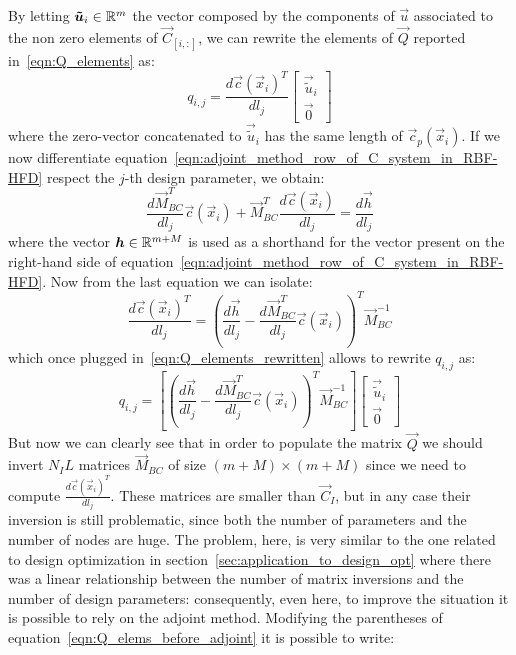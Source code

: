 By letting $\boldsymbol{\tilde{u}}_i \in \mathbb{R}^m$ the vector composed by the components of $\vec{u}$ associated to the non zero elements of $\vec{C}_{[i,:]}$, we can rewrite the elements of $\vec{Q}$ reported in~\eqref{eqn:Q_elements} as:
\begin{equation}
	\label{eqn:Q_elements_rewritten}
	q_{i,j} =
	\frac{d\vec{c}(\vec{x}_i)^T}{dl_j}
	\begin{bmatrix}
		\vec{\tilde{u}}_i  \\
		\vec{0}
	\end{bmatrix}
\end{equation}
where the zero-vector concatenated to $\vec{\tilde{u}}_i$ has the same length of $\vec{c}_p(\vec{x}_i)$.
If we now differentiate equation~\eqref{eqn:adjoint_method_row_of_C_system_in_RBF-HFD} respect the $j$-th design parameter, we obtain:
\begin{equation}
	\frac{d \vec{M}_{BC}^T}{d l_j} \vec{c}(\vec{x}_i) + \vec{M}_{BC}^T \frac{d \vec{c}(\vec{x}_i)}{d l_j} = \frac{d \vec{h}}{d l_j}
\end{equation}
where the vector $\boldsymbol{h} \in \mathbb{R}^{m+M}$ is used as a shorthand for the vector present on the right-hand side of equation~\eqref{eqn:adjoint_method_row_of_C_system_in_RBF-HFD}. Now from the last equation we can isolate:
\begin{equation}
	\frac{d \vec{c}(\vec{x}_i)^T}{dl_j} = \left( \frac{d \vec{h}}{d l_j} - \frac{d \vec{M}_{BC}^T}{d l_j} \vec{c}(\vec{x}_i) \right)^T \vec{M}_{BC}^{-1}
\end{equation}
which once plugged in~\eqref{eqn:Q_elements_rewritten} allows to rewrite $q_{i,j}$ as:
\begin{equation}
	\label{eqn:Q_elems_before_adjoint}
	q_{i,j} =
	\left[ \left( \frac{d \vec{h}}{d l_j} - \frac{d \vec{M}_{BC}^T}{d l_j} \vec{c}(\vec{x}_i) \right)^T \vec{M}_{BC}^{-1} \right]
	\begin{bmatrix}
		\vec{\tilde{u}}_i  \\
		\vec{0}
	\end{bmatrix}
\end{equation}
But now we can clearly see that in order to populate the matrix $\vec{Q}$ we should invert $N_IL$ matrices $\vec{M}_{BC}$ of size $(m+M) \times (m+M)$ since we need to compute $\frac{d \vec{c}(\vec{x}_i)^T}{dl_j}$. These matrices are smaller than $\vec{C}_I$, but in any case their inversion is still problematic, since both the number of parameters and the number of nodes are huge. The problem, here, is very similar to the one related to design optimization in section~\ref{sec:application_to_design_opt} where there was a linear relationship between the number of matrix inversions and the number of design parameters: consequently, even here, to improve the situation it is possible to rely on the adjoint method. Modifying the parentheses of equation~\eqref{eqn:Q_elems_before_adjoint} it is possible to write:
